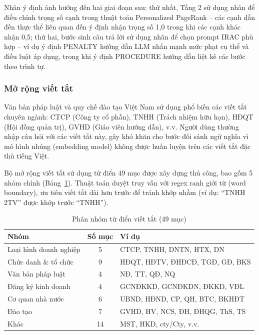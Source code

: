 Nhãn ý định ảnh hưởng đến hai giai đoạn sau: thứ nhất, Tầng 2 sử dụng nhãn để điều chỉnh
trọng số cạnh trong thuật toán Personalized PageRank -- các cạnh dẫn đến thực thể
liên quan đến ý định nhận trọng số 1,0 trong khi các cạnh khác nhận 0,5; thứ hai, bước
sinh câu trả lời sử dụng nhãn để chọn prompt IRAC phù hợp -- ví dụ ý định PENALTY
hướng dẫn LLM nhấn mạnh mức phạt cụ thể và điều luật áp dụng, trong khi ý định
PROCEDURE hướng dẫn liệt kê các bước theo trình tự.

\subsubsection{Mở rộng viết tắt}
\label{subsec:mo-rong-viet-tat}

Văn bản pháp luật và quy chế đào tạo Việt Nam sử dụng phổ biến các viết tắt chuyên
ngành: CTCP (Công ty cổ phần), TNHH (Trách nhiệm hữu hạn), HĐQT (Hội đồng quản
trị), GVHD (Giáo viên hướng dẫn), v.v. Người dùng thường nhập câu hỏi với các viết
tắt này, gây khó khăn cho bước đối sánh ngữ nghĩa vì mô hình nhúng (embedding model)
không được huấn luyện trên các viết tắt đặc thù tiếng Việt.

Bộ mở rộng viết tắt sử dụng từ điển 49 mục được xây dựng thủ công, bao gồm 5 nhóm
chính (Bảng~\ref{tab:abbreviation-groups}). Thuật toán duyệt truy vấn với regex ranh
giới từ (word boundary), ưu tiên viết tắt dài hơn trước để tránh khớp nhầm (ví dụ:
``TNHH 2TV'' được khớp trước ``TNHH'').

\begin{table}[htbp]
  \centering
  \caption{Phân nhóm từ điển viết tắt (49 mục)}
  \label{tab:abbreviation-groups}
  \begin{tabular}{lcp{7cm}}
    \toprule
    \textbf{Nhóm} & \textbf{Số mục} & \textbf{Ví dụ} \\
    \midrule
    Loại hình doanh nghiệp & 5 & CTCP, TNHH, DNTN, HTX, DN \\
    Chức danh \& tổ chức   & 9 & HĐQT, HĐTV, ĐHĐCĐ, TGĐ, GĐ, BKS \\
    Văn bản pháp luật      & 4 & NĐ, TT, QĐ, NQ \\
    Đăng ký kinh doanh     & 4 & GCNĐKKD, GCNĐKDN, ĐKKD, VĐL \\
    Cơ quan nhà nước        & 6 & UBND, HĐND, CP, QH, BTC, BKHĐT \\
    Đào tạo                & 7 & GVHD, HV, NCS, ĐH, ĐHQG, ThS, TS \\
    Khác                   & 14 & MST, HKD, cty/Cty, v.v. \\
    \bottomrule
  \end{tabular}
\end{table}

